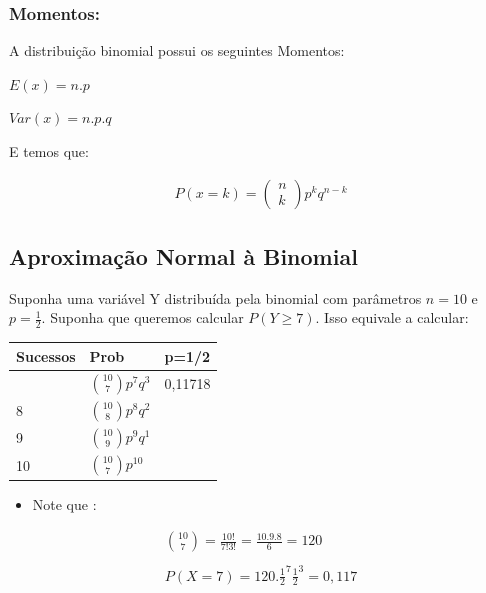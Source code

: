 \documentclass[
  letterpaper,
  DIV=11,
  numbers=noendperiod]{scrartcl}
\providecommand{\tightlist}{%
  \setlength{\itemsep}{0pt}\setlength{\parskip}{0pt}}
\begin{document}
\subsubsection{Momentos:}\label{momentos-1}

\begin{definicao}

A distribuição binomial possui os seguintes Momentos:

\(E(x)=n. p\)

\(Var(x)=n.p.q\)

E temos que:

\[\begin{array}{ccc}
P(x=k)=\begin{pmatrix} n
\\  k
\end{pmatrix} p ^{k} q ^{n-k}
\end{array}\]

\end{definicao}

\subsection{Aproximação Normal à
Binomial}\label{aproximauxe7uxe3o-normal-uxe0-binomial}

Suponha uma variável Y distribuída pela binomial com parâmetros \(n=10\)
e \(p=\frac{1}{2}\). Suponha que queremos calcular \(P(Y \geq 7)\). Isso
equivale a calcular:

\begin{longtable}[]{@{}lll@{}}
\toprule\noalign{}
Sucessos & Prob & p=1/2 \\
\midrule\noalign{}
\endhead
\bottomrule\noalign{}
\endlastfoot
7 & \(\binom{10}{7}p^{7}q^{3}\) & 0,11718 \\
8 & \(\binom{10}{8}p^{8}q^{2}\) & \\
9 & \(\binom{10}{9}p^{9}q^{1}\) & \\
10 & \(\binom{10}{7}p^{10}\) & \\
\end{longtable}

\begin{itemize}
\tightlist
\item
  Note que :
\end{itemize}

\[\begin{array}{ccc}
\binom{10}{7}=\frac{10!}{7! 3!}= \frac{10.9.8}{6}=120
\\
\\
P(X=7)=120 . \frac{1}{2}^{7}\frac{1}{2}^{3}=0,117
\end{array}\]
\end{document}
